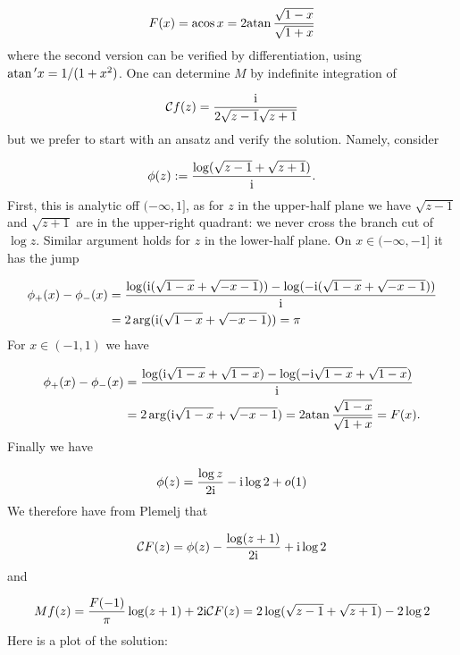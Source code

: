 \documentclass[12pt,a4paper]{article}
\def\I{ {\rm i} }
\def\CC{ {\cal C} }
\def\acos{ {\rm acos}\, }
\def\atan{ {\rm atan}\, }
\begin{document}
\[
F(x) = \acos x = 2 \atan {\sqrt{1-x} \over \sqrt{1+x}}
\]
where the second version can be verified by differentiation, using $\atan' x = 1/(1+x^2)$.  One can determine $M$ by indefinite integration of 

\[
\CC f(z) = {\I \over 2 \sqrt{z-1}\sqrt{z+1}}
\]
but we prefer to start with an ansatz and verify the solution. Namely, consider

\[
\phi(z) := {\log(\sqrt{z-1} + \sqrt{z+1}) \over \I}.
\]
First, this is analytic off $(-\infty,1]$, as for $z$ in the upper-half plane we have  $\sqrt{z-1}$ and $\sqrt{z+1}$ are  in the upper-right quadrant: we never cross the branch cut of $\log z$. Similar argument holds for $z$ in the lower-half plane. On $x \in (-\infty,-1]$ it has the jump


\begin{align*}
\phi_+(x) - \phi_-(x) &= {\log(\I (\sqrt{1-x} + \sqrt{-x-1})) -  \log(-\I (\sqrt{1-x} + \sqrt{-x-1})) \over \I} \\
& =
        2 \arg(\I (\sqrt{1-x} + \sqrt{-x-1})) = \pi
\end{align*}
For $x \in (-1,1)$ we have


\begin{align*}
\phi_+(x) - \phi_-(x) &= {\log(\I \sqrt{1-x} + \sqrt{1-x}) -  \log(-\I \sqrt{1-x} + \sqrt{1-x}) \over \I} \\
& =
        2 \arg(\I \sqrt{1-x} + \sqrt{-x-1}) = 2 \atan {\sqrt{1-x} \over \sqrt{1+x}} = F(x).
\end{align*}
Finally we have

\[
\phi(z) = {\log z \over 2 \I} - \I \log 2 + o(1)
\]
We therefore have from Plemelj that

\[
\CC F(z) = \phi(z) - {\log(z+1) \over 2 \I} + \I \log 2 
\]
and

\[
Mf(z) = {F(-1)\over \pi} \log(z+1)  + 2 \I \CC F(z) =2\log(\sqrt{z-1} + \sqrt{z+1}) -2 \log 2
\]
Here is a plot of the solution:
\end{document}
